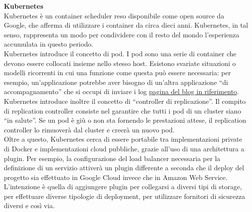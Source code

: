 \textbf{Kubernetes}\\
Kubernetes è un container scheduler reso disponibile come open source da Google, che afferma di utilizzare i container da circa dieci anni. Kubernetes, in tal senso, rappresenta un modo per condividere con il resto del mondo l’esperienza accumulata in questo periodo.\\
Kubernetes introduce il concetto di pod. I pod sono una serie di container che devono essere collocati insieme nello stesso host. Esistono svariate situazioni o modelli ricorrenti in cui una funzione come questa può essere necessaria: per esempio, un’applicazione potrebbe aver bisogno di un’altra applicazione “di accompagnamento” che si occupi di inviare i log \href{http://blog.kubernetes.io/2015/06/the-distributed-system-toolkit-patterns.html}{pagina del blog in riferimento}.\\
Kubernetes introduce inoltre il concetto di “controller di replicazione”. Il compito di replication controller consiste nel garantire che tutti i pod di un cluster siano “in salute”. Se un pod è giù o non sta fornendo le prestazioni attese, il replication controller lo rimuoverà dal cluster e creerà un nuovo pod.\\
Oltre a questo, Kubernetes cerca di essere portabile tra implementazioni private di Docker e implementazioni cloud pubbliche, grazie all’uso di una architettura a plugin. Per esempio, la configurazione del load balancer necessaria per la definizione di un servizio attiverà un plugin differente a seconda che il deploy del progetto sia effettuato in Google Cloud invece che in Amazon Web Service. L’intenzione è quella di aggiungere plugin per collegarsi a diversi tipi di storage, per effettuare diverse tipologie di deployment, per utilizzare fornitori di sicurezza diversi e così via.\\